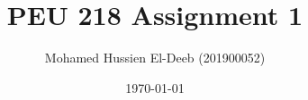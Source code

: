 \documentclass[12pt]{article}
\title{PEU 218 Assignment 1}
\author{Mohamed Hussien El-Deeb (201900052)}
\date{\today}
\begin{document}
\maketitle
\tableofcontents





\nocite{El-Deeb_PEU-356_Assignments}
\end{document}
